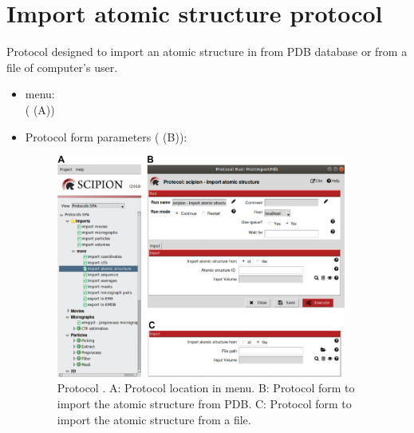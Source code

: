 \section{Import atomic structure protocol}
\label{app:importAtomicStructure}%
Protocol designed to import an atomic structure in \scipion from PDB database or from a file of computer's user.
   
 \begin{itemize}
  \item \scipion menu:\\
   ( (A))\\
  
  \item Protocol form parameters ( (B)):\\
  
  \begin{figure}[H]
    \centering 
    \captionsetup{width=.7\linewidth} 
    \includegraphics[width=0.90\textwidth]{Images_appendix/Fig110.pdf}
    \caption{Protocol . A: Protocol location in \scipion menu. B: Protocol form to import the atomic structure from PDB. C: Protocol form to import the atomic structure from a file.}
    \label{fig:app_protocol_atomicStructure_1}
   \end{figure}


\end{itemize}
